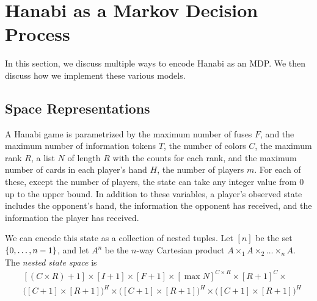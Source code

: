 \section{Hanabi as a Markov Decision Process}\label{sec:hanabimdp}

In this section, we discuss multiple ways to encode Hanabi as an MDP. We then
discuss how we implement these various models.

\subsection{Space Representations}

A Hanabi game is parametrized by the maximum number of fuses $F$, and the
maximum number of information tokens $T$, the number of colors $C$, the maximum
rank $R$, a list $N$ of length $R$ with the counts for each rank, and the
maximum number of cards in each player's hand $H$, the number of players $m$.
For each of these, except the number of players, the state can take any integer
value from 0 up to the upper bound. In addition to these variables, a player's
observed state includes the opponent's hand, the information the opponent has
received, and the information the player has received.

We can encode this state as a collection of nested tuples. Let $[n]$ be the set
$\left\{0, \ldots, n-1\right\}$, and let $A^n$ be the $n$-way Cartesian product $A
\times_1 A \times_2 \ldots \times_n A$.
The \emph{nested state space} is
\begin{align*}
    &[(C \times R) + 1] \times
  [I + 1] \times
  [F + 1] \times
  {[\max{N}]}^{C \times R}
  \times
  {[R + 1]}^{C} \times \\
    &{\bigl([C + 1] \times [R + 1]\bigr)}^{H}
  \times {\bigl([C + 1] \times [R + 1]\bigr)}^{H}
  \times {\bigl([C + 1] \times [R + 1]\bigr)}^{H}
\end{align*}

